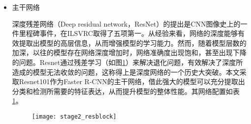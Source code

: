 \begin{itemize}
    \item 主干网络 
    
    深度残差网络（Deep residual network，ResNet\cite{8he2016deep}）的提出是CNN图像史上的一件里程碑事件，在ILSVRC取得了五项第一。从经验来看，网络的深度能够有效提取出模型的高层信息，从而增强模型的学习能力。然而，随着模型层数的加深，以往的模型存在网络深度增加时，网络准确度出现饱和，甚至出现下降的问题。Resnet通过残差学习（如图\ref{fig:stage2_resblock}）来解决退化问题，有效解决了深度所造成的模型无法收敛的问题，这称得上是深度网络的一个历史大突破。本文采取Resnet101作为Faster R-CNN的主干网络，借此强大的模型可以充分提取出分类和检测所需要的特征表达，从而提升模型的整体性能。其网络配置如表\ref{tab:stage2_resmodel}。

\begin{figure}[!htbp]
    \centering
    \texttt{[image: stage2\_resblock]}
    \label{fig:stage2_resblock}
\end{figure}

\begin{table}[!htbp]
    \label{tab:stage2_resmodel}
    \centering
    \footnotesize%
    \setlength{\tabcolsep}{4pt}%
    \begin{tabular}{c|c|c|c|c}
        \hline
        

\end{tabular}
\end{table}
\end{itemize}
